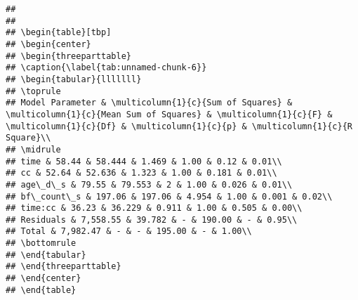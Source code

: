 \documentclass[]{article}
\newenvironment{Shaded}{\begin{snugshade}}{\end{snugshade}}
\newcommand{\KeywordTok}[1]{\textcolor[rgb]{0.13,0.29,0.53}{\textbf{#1}}}
\newcommand{\DataTypeTok}[1]{\textcolor[rgb]{0.13,0.29,0.53}{#1}}
\newcommand{\DecValTok}[1]{\textcolor[rgb]{0.00,0.00,0.81}{#1}}
\newcommand{\StringTok}[1]{\textcolor[rgb]{0.31,0.60,0.02}{#1}}
\newcommand{\OperatorTok}[1]{\textcolor[rgb]{0.81,0.36,0.00}{\textbf{#1}}}
\newcommand{\NormalTok}[1]{#1}
\begin{document}
\begin{verbatim}
## 
## 
## \begin{table}[tbp]
## \begin{center}
## \begin{threeparttable}
## \caption{\label{tab:unnamed-chunk-6}}
## \begin{tabular}{lllllll}
## \toprule
## Model Parameter & \multicolumn{1}{c}{Sum of Squares} & \multicolumn{1}{c}{Mean Sum of Squares} & \multicolumn{1}{c}{F} & \multicolumn{1}{c}{Df} & \multicolumn{1}{c}{p} & \multicolumn{1}{c}{R Square}\\
## \midrule
## time & 58.44 & 58.444 & 1.469 & 1.00 & 0.12 & 0.01\\
## cc & 52.64 & 52.636 & 1.323 & 1.00 & 0.181 & 0.01\\
## age\_d\_s & 79.55 & 79.553 & 2 & 1.00 & 0.026 & 0.01\\
## bf\_count\_s & 197.06 & 197.06 & 4.954 & 1.00 & 0.001 & 0.02\\
## time:cc & 36.23 & 36.229 & 0.911 & 1.00 & 0.505 & 0.00\\
## Residuals & 7,558.55 & 39.782 & - & 190.00 & - & 0.95\\
## Total & 7,982.47 & - & - & 195.00 & - & 1.00\\
## \bottomrule
## \end{tabular}
## \end{threeparttable}
## \end{center}
## \end{table}
\end{verbatim}

\begin{Shaded}
\end{Shaded}
\end{document}
